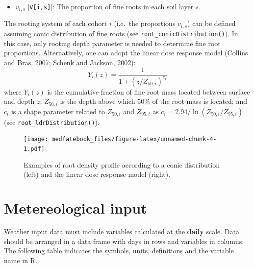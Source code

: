 \documentclass[]{book}
\providecommand{\tightlist}{%
  \setlength{\itemsep}{0pt}\setlength{\parskip}{0pt}}
\begin{document}
\begin{itemize}
\tightlist
\item
  \(v_{i,s}\) {[}\texttt{V{[}i,s{]}}{]}: The proportion of fine roots in each soil layer \(s\).
\end{itemize}

The rooting system of each cohort \(i\) (i.e.~the proportions \(v_{i,s}\)) can be defined assuming conic distribution of fine roots (see \texttt{root\_conicDistribution()}). In this case, only rooting depth parameter is needed to determine fine root proportions. Alternatively, one can adopt the linear dose response model (Collins and Bras, 2007; Schenk and Jackson, 2002):
\begin{equation}
Y_i(z)=\frac{1}{1+(z/Z_{50,i})^{c_i}}
\end{equation}
where \(Y_i(z)\) is the cumulative fraction of fine root mass located between surface and depth \(z\); \(Z_{50,i}\) is the depth above which 50\% of the root mass is located; and \(c_i\) is a shape parameter related to \(Z_{50,i}\) and \(Z_{95,i}\) as \(c_i = 2.94 / \ln(Z_{50,i} / Z_{95,i})\) (see \texttt{root\_ldrDistribution()}).

\begin{figure}
\centering
\texttt{[image: medfatebook\_files/figure-latex/unnamed-chunk-4-1.pdf]}
\caption{\label{fig:unnamed-chunk-4}Examples of root density profile according to a conic distribution (left) and the linear dose response model (right).}
\end{figure}

\hypertarget{meteoinput}{%
\section{Metereological input}\label{meteoinput}}

Weather input data must include variables calculated at the \textbf{daily} scale. Data should be arranged in a data frame with days in rows and variables in columns. The following table indicates the symbols, units, definitions and the variable name in R.
\end{document}
